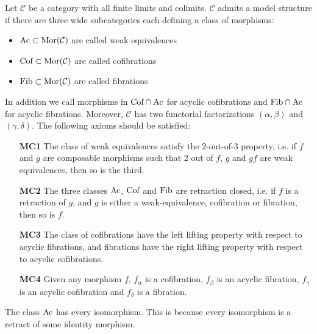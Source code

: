 \documentclass[../thesis.tex]{subfiles}
\begin{document}
            \begin{definition}
                Let $\mathcal{C}$ be a category with all finite limits and colimits. $\mathcal{C}$ admits a model structure if there are three wide subcategories each defining a class of morphisms:
                \begin{itemize}
                    \item $\tt{Ac} \subset \tt{Mor}(\mathcal{C})$ are called weak equivalences
                    \item $\tt{Cof}\subset \tt{Mor}(\mathcal{C})$ are called cofibrations
                    \item $\tt{Fib}\subset \tt{Mor}(\mathcal{C})$ are called fibrations
                \end{itemize}
                In addition we call morphisms in $\tt{Cof}\cap \tt{Ac}$ for acyclic cofibrations and $\tt{Fib}\cap \tt{Ac}$ for acyclic fibrations. Moreover, $\mathcal{C}$ has two functorial factorizations $(\alpha, \beta)$ and $(\gamma, \delta)$. The following axioms should be satisfied:
                \begin{itemize}
                    \item[\textbf{MC1}] The class of weak equivalences satisfy the $2$-out-of-$3$ property, i.e. if $f$ and $g$ are composable morphisms such that $2$ out of $f$, $g$ and $gf$ are weak equivalences, then so is the third.
                    \item[\textbf{MC2}] The three classes $\tt{Ac}$, $\tt{Cof}$ and $\tt{Fib}$ are retraction closed, i.e. if $f$ is a retraction of $g$, and $g$ is either a weak-equivalence, cofibration or fibration, then so is $f$.
                    \item[\textbf{MC3}] The class of cofibrations have the left lifting property with respect to acyclic fibrations, and fibrations have the right lifting property with respect to acyclic cofibrations.
                    \item[\textbf{MC4}] Given any morphism $f$, $f_\alpha$ is a cofibration, $f_\beta$ is an acyclic fibration, $f_\gamma$ is an acyclic cofibration and $f_\delta$ is a fibration.      
                \end{itemize}
            \end{definition}

            \begin{remark}
                The class $\tt{Ac}$ has every isomorphism. This is because every isomorphism is a retract of some identity morphism.
            \end{remark}
\end{document}
